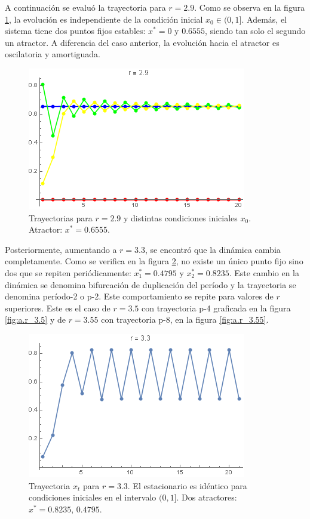 \documentclass[aps,prb,twocolumn,superscriptaddress,floatfix,longbibliography]{revtex4-2}
\newcounter{para}
\begin{document}
A continuación se evaluó la trayectoria para $r = 2.9$. Como se observa en la figura \ref{fig:a.r_2.9}, la evolución es independiente de la condición inicial $x_0 \in (0,1]$. Además, el sistema tiene dos puntos fijos estables: $x^*=0$ y $0.6555$, siendo tan solo el segundo un atractor. A diferencia del caso anterior, la evolución hacia el atractor es oscilatoria y amortiguada.

\begin{figure}[htp]
    \includegraphics[clip=true,width=0.7\columnwidth]{a.r_2.9.png}
    \caption{Trayectorias para $r = 2.9$ y distintas condiciones iniciales $x_0$. Atractor: $x^* = 0.6555$.}
     \label{fig:a.r_2.9}
\end{figure}

Posteriormente, aumentando a $r = 3.3$, se encontró que la dinámica cambia completamente. Como se verifica en la figura \ref{fig:a.r_3.3}, no existe un único punto fijo sino dos que se repiten periódicamente: $x_1^* = 0.4795$ y $x_2^* = 0.8235$. Este cambio en la dinámica se denomina bifurcación de duplicación del período y la trayectoria se denomina período-2 o p-2. Este comportamiento se repite para valores de $r$ superiores. Este es el caso de $r = 3.5$ con trayectoria p-4 graficada en la figura \ref{fig:a.r_3.5} y de $r = 3.55$ con trayectoria p-8, en la figura \ref{fig:a.r_3.55}.

\begin{figure}[htp]
    \includegraphics[clip=true,width=0.7\columnwidth]{a.r_3.3.png}
    \caption{Trayectoria $x_t$ para $r = 3.3$. El estacionario es idéntico para condiciones iniciales en el intervalo $(0,1]$. Dos atractores: $x^* = 0.8235$, $0.4795$.}
     \label{fig:a.r_3.3}
\end{figure}
\end{document}
